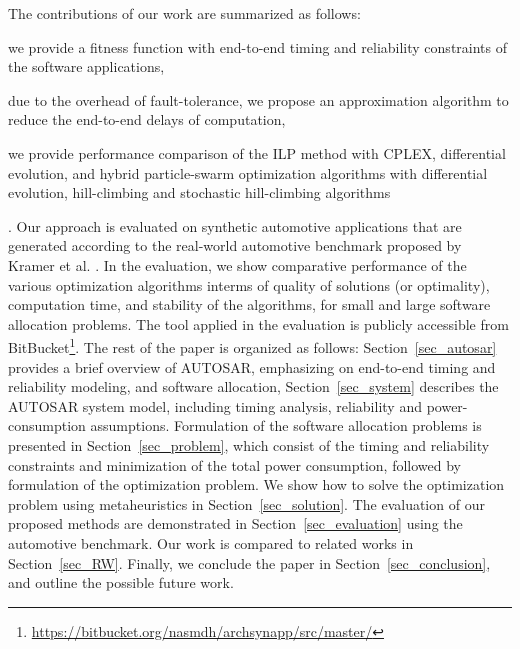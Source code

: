 The contributions of our work are summarized as follows: 
\begin{enumerate*}[label=(\roman*)]
	\item we provide a fitness function with end-to-end timing and reliability constraints of the software applications,
	\item due to the overhead of fault-tolerance, we propose an approximation algorithm to reduce the end-to-end delays of computation,
	\item we provide performance comparison of the ILP method with CPLEX, differential evolution, and hybrid particle-swarm optimization algorithms with differential evolution, hill-climbing and stochastic hill-climbing algorithms
\end{enumerate*}. Our approach is evaluated on synthetic automotive applications that are generated according to the real-world automotive benchmark proposed by Kramer et al. \cite{Kramer2015RealFree}. In the evaluation, we show comparative performance of the various optimization algorithms interms of quality of solutions (or optimality), computation time,  and stability of the algorithms, for small and large software allocation problems. The tool applied in the evaluation is publicly accessible from BitBucket\footnote{\url{https://bitbucket.org/nasmdh/archsynapp/src/master/}}. 
The rest of the paper is organized as follows:
Section~\ref{sec_autosar} provides a brief overview of AUTOSAR, emphasizing on end-to-end timing and reliability modeling, and software allocation,
Section~\ref{sec_system} describes the AUTOSAR system model, including timing analysis, reliability and power-consumption assumptions.
Formulation of the software allocation problems is presented in Section~\ref{sec_problem}, which consist of the timing and reliability constraints and minimization of the total power consumption, followed by formulation of the optimization problem. 
We show how to solve the optimization problem using metaheuristics in Section~\ref{sec_solution}. The evaluation of our proposed methods are demonstrated in Section~\ref{sec_evaluation} using the automotive benchmark. Our work is compared to related works in Section~\ref{sec_RW}. Finally, we conclude the paper in Section~\ref{sec_conclusion}, and outline the possible future work.


